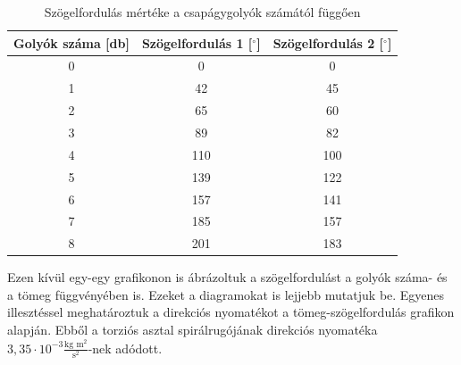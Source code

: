 \documentclass{article}
\begin{document}

\begin{table}[H]
    \centering
    \begin{tabular}{|c|c|c|}
        \hline
        Golyók száma [db] & Szögelfordulás 1 [$^\circ$] & Szögelfordulás 2 [$^\circ$] \\ \hline
        0                 & 0                           & 0                           \\ \hline 
        1                 & 42                          & 45                          \\ \hline
        2                 & 65                          & 60                          \\ \hline 
        3                 & 89                          & 82                          \\ \hline
        4                 & 110                         & 100                         \\ \hline 
        5                 & 139                         & 122                         \\ \hline
        6                 & 157                         & 141                         \\ \hline 
        7                 & 185                         & 157                         \\ \hline
        8                 & 201                         & 183                         \\ \hline
    \end{tabular}
    \caption{Szögelfordulás mértéke a csapágygolyók számától függően}
    \label{tab:szogelfordulas}
\end{table}

Ezen kívül egy-egy grafikonon is ábrázoltuk a szögelfordulást a golyók száma- és a tömeg függvényében is. Ezeket a diagramokat is lejjebb mutatjuk be. Egyenes illesztéssel meghatároztuk a direkciós nyomatékot a tömeg-szögelfordulás grafikon alapján. Ebből a torziós asztal spirálrugójának direkciós nyomatéka $3,35 \cdot 10^{-3} \frac{\text{kg m}^2}{\text{s}^2}$-nek adódott.
\end{document}
